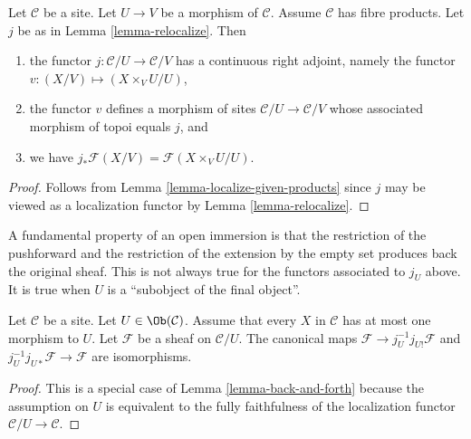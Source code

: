 \begin{lemma}
\label{lemma-relocalize-given-fibre-products}
Let $\mathcal{C}$ be a site. Let $U \to V$ be a morphism of $\mathcal{C}$.
Assume $\mathcal{C}$ has fibre products. Let $j$ be as in
Lemma \ref{lemma-relocalize}. Then
\begin{enumerate}
\item the functor $j : \mathcal{C}/U \to \mathcal{C}/V$
has a continuous right adjoint, namely the functor
$v : (X/V) \mapsto (X \times_V U/U)$,
\item the functor $v$ defines a morphism of sites
$\mathcal{C}/U \to \mathcal{C}/V$ whose associated morphism of topoi equals
$j$, and
\item we have $j_*\mathcal{F}(X/V) = \mathcal{F}(X \times_V U/U)$.
\end{enumerate}
\end{lemma}

\begin{proof}
Follows from Lemma \ref{lemma-localize-given-products} since $j$ may be viewed
as a localization functor by Lemma \ref{lemma-relocalize}.
\end{proof}

\noindent
A fundamental property of an open immersion is
that the restriction of the pushforward and the restriction
of the extension by the empty set produces back the original sheaf.
This is not always true for the functors associated to $j_U$
above. It is true when $U$ is a ``subobject of the final object''.

\begin{lemma}
\label{lemma-restrict-back}
Let $\mathcal{C}$ be a site.
Let $U \in \Ob(\mathcal{C})$.
Assume that every $X$ in $\mathcal{C}$ has at most
one morphism to $U$. Let $\mathcal{F}$ be a sheaf on $\mathcal{C}/U$.
The canonical maps $\mathcal{F} \to j_U^{-1}j_{U!}\mathcal{F}$
and $j_U^{-1}j_{U*}\mathcal{F} \to \mathcal{F}$ are
isomorphisms.
\end{lemma}

\begin{proof}
This is a special case of Lemma \ref{lemma-back-and-forth}
because the assumption on $U$ is equivalent to the fully faithfulness
of the localization functor $\mathcal{C}/U \to \mathcal{C}$.
\end{proof}

